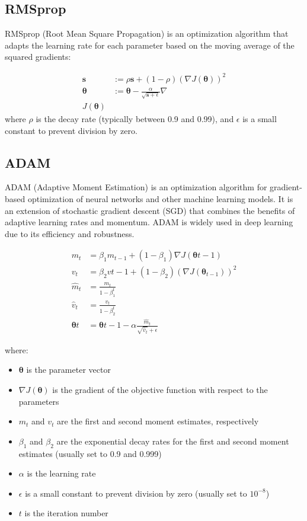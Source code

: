 \documentclass[12pt]{article}
\begin{document}
\subsection{RMSprop}

RMSprop (Root Mean Square Propagation) is an optimization algorithm that adapts the learning rate for each parameter based on the moving average of the squared gradients:

\begin{align*}
	\mathbf{s} &:= \rho \mathbf{s} + (1 - \rho) (\nabla J(\boldsymbol{\theta}))^2\\
\boldsymbol{\theta} &:= \boldsymbol{\theta} - \frac{\alpha}{\sqrt{\mathbf{s} + \epsilon}} \nabla \\J(\boldsymbol{\theta})
\end{align*}
where $\rho$ is the decay rate (typically between 0.9 and 0.99), and $\epsilon$ is a small constant to prevent division by zero.

\subsection{ADAM}

ADAM (Adaptive Moment Estimation) is an optimization algorithm for gradient-based optimization of neural networks and other machine learning models. It is an extension of stochastic gradient descent (SGD) that combines the benefits of adaptive learning rates and momentum. ADAM is widely used in deep learning due to its efficiency and robustness.

\begin{align*}
m_t &= \beta_1 m_{t-1} + (1 - \beta_1) \nabla J(\boldsymbol{\theta}{t-1}) \\
v_t &= \beta_2 v{t-1} + (1 - \beta_2) (\nabla J(\boldsymbol{\theta}_{t-1}))^2 \\
\hat{m}_t &= \frac{m_t}{1 - \beta_1^t} \\
\hat{v}_t &= \frac{v_t}{1 - \beta_2^t} \\
\boldsymbol{\theta}t &= \boldsymbol{\theta}{t-1} - \alpha \frac{\hat{m}_t}{\sqrt{\hat{v}_t} + \epsilon}
\end{align*}



where:
\begin{itemize}
\item $\boldsymbol{\theta}$ is the parameter vector
\item $\nabla J(\boldsymbol{\theta})$ is the gradient of the objective function with respect to the parameters
\item $m_t$ and $v_t$ are the first and second moment estimates, respectively
\item $\beta_1$ and $\beta_2$ are the exponential decay rates for the first and second moment estimates (usually set to 0.9 and 0.999)
\item $\alpha$ is the learning rate
\item $\epsilon$ is a small constant to prevent division by zero (usually set to $10^{-8}$)
\item $t$ is the iteration number
\end{itemize}
\end{document}

